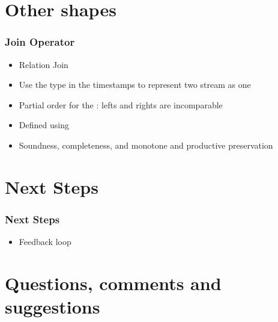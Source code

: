 \documentclass[aspectratio=169,10pt]{beamer}
\begin{document}
\section{Other shapes}

\begin{frame}[fragile]
  \frametitle{Join Operator}
  \begin{itemize}
    \item Relation Join
    \item Use the  type in the timestamps to represent two stream as one
    \item Partial order for the : lefts and rights are incomparable
    \item Defined using 
    \item Soundness, completeness, and monotone and productive preservation
  \end{itemize}
\end{frame}

\section{Next Steps}

\begin{frame}
  \frametitle{Next Steps}
  \begin{itemize}
    \item Feedback loop
  \end{itemize}
\end{frame}

\section{Questions, comments and suggestions}
\end{document}
